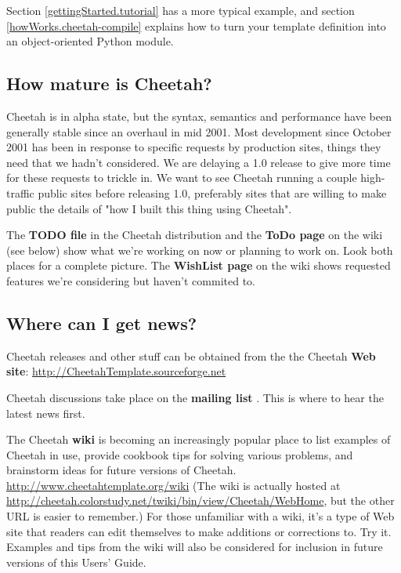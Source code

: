 Section \ref{gettingStarted.tutorial} has a more typical example, and section
\ref{howWorks.cheetah-compile} explains how to turn your template definition
into an object-oriented Python module.


\subsection{How mature is Cheetah?}
\label{intro.mature}

Cheetah is in alpha state, but the syntax, semantics and performance have been
generally stable since an overhaul in mid 2001.  Most development since
October 2001 has been in response to specific requests by production sites,
things they need that we hadn't considered.  We are delaying a 1.0 release to
give more time for these requests to trickle in.  We want to see Cheetah running
a couple high-traffic public sites before releasing 1.0, preferably sites that
are willing to make public the details of "how I built this thing using
Cheetah".

The {\bf TODO file} in the Cheetah distribution and the {\bf ToDo page} on the
wiki (see below) show what we're working on now or planning to work on.  Look
both places for a complete picture.  The {\bf WishList page} on the wiki shows
requested features we're considering but haven't commited to.

\subsection{Where can I get news?}
\label{intro.news}

Cheetah releases and other stuff can be obtained from the the Cheetah 
{\bf Web site}:
\url{http://CheetahTemplate.sourceforge.net}

Cheetah discussions take place on the {\bf mailing list}
.  This is where to hear
the latest news first.

The Cheetah {\bf wiki} is becoming an increasingly popular place to list
examples of Cheetah in use, provide cookbook tips for solving various problems,
and brainstorm ideas for future versions of Cheetah.
\url{http://www.cheetahtemplate.org/wiki}
(The wiki is actually hosted at
\url{http://cheetah.colorstudy.net/twiki/bin/view/Cheetah/WebHome}, but the 
other URL is easier to remember.)
For those unfamiliar with a wiki, it's a type of Web site that readers can edit
themselves to make additions or corrections to.  Try it.  Examples and tips 
from the wiki will also be considered for inclusion in future versions of this
Users' Guide.

